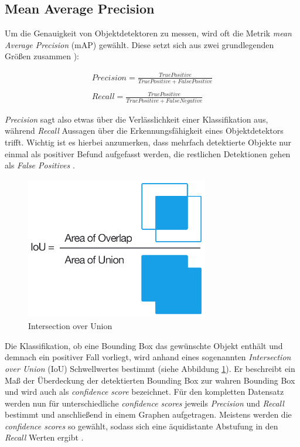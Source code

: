 \subsection*{Mean Average Precision}

Um die Genauigkeit von Objektdetektoren zu messen, wird oft die Metrik \textit{mean Average Precision} (mAP) gewählt. Diese setzt sich aus zwei grundlegenden Größen zusammen \cite{JonathanHui.20180307}):

\begin{equation} \label{precisionandrecall}
\begin{split}
Precision = \frac{True Positive}{True Positive + False Positive} \\
\\
Recall = \frac{True Positive}{True Positive + False Negative}
\end{split}
\end{equation}

\textit{Precision} sagt also etwas über die Verlässlichkeit einer Klassifikation aus, während \textit{Recall} Aussagen über die Erkennungsfähigkeit eines Objektdetektors trifft. Wichtig ist es hierbei anzumerken, dass mehrfach detektierte Objekte nur einmal als positiver Befund aufgefasst werden, die restlichen Detektionen gehen als \textit{False Positives} \cite{TarangShah.20180127}.

\begin{figure}[ht]
	\begin{center}
		\includegraphics[width=8cm]{Bilder/iou_equation.png} 
		\caption[Intersection over Union]{Intersection over Union \cite{AdrianRosebrock.20161107}}
		\label{iou}
	\end{center}
\end{figure}

Die Klassifikation, ob eine Bounding Box das gewünschte Objekt enthält und demnach ein positiver Fall vorliegt, wird anhand eines sogenannten \textit{Intersection over Union} (IoU) Schwellwertes bestimmt (siehe Abbildung \ref{iou}). Er beschreibt ein Maß der Überdeckung der detektierten Bounding Box zur wahren Bounding Box und wird auch als \textit{confidence score} bezeichnet. Für den kompletten Datensatz werden nun für unterschiedliche \textit{confidence scores} jeweils \textit{Precision} und \textit{Recall} bestimmt und anschließend in einem Graphen aufgetragen. Meistens werden die \textit{confidence scores} so gewählt, sodass sich eine äquidistante Abstufung in den \textit{Recall} Werten ergibt \cite{TarangShah.20180127}. 

